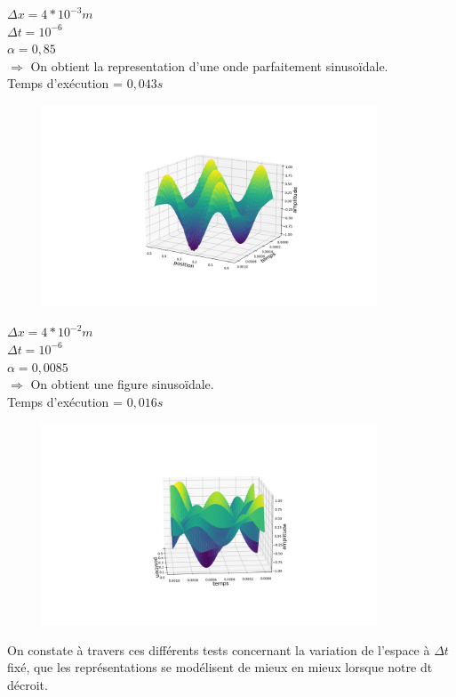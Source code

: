 \begin{enumerate}[label=\alph*)]

\begin{minipage}{.45\textwidth}%

\item $\Delta x=4*{10}^{-3}m$ \\
$\Delta t= {10}^{-6}$ \\
$\alpha= 0,85$\\


$\Longrightarrow$ On obtient la representation d'une onde parfaitement sinusoïdale.\\
Temps d'exécution = $0,043s$

\end{minipage}%
\hfill
\begin{minipage}{.6\textwidth}%
\includegraphics[width=12cm,height=6cm]{dt=10^-6 et dx=0.004.png}

\end{minipage}%
\newline
\begin{minipage}{.45\textwidth}%
\item $\Delta x=4*{10}^{-2}m$ \\
$\Delta t= {10}^{-6}$ \\
$\alpha= 0,0085$\\


$\Longrightarrow$ On obtient une figure sinusoïdale.\\
Temps d'exécution = $0,016s$

\end{minipage}%
\begin{minipage}{.45\textwidth}%
\includegraphics[width=12cm,height=6cm]{dt=10^-6 avec dx=0.04.png}

\end{minipage}%

On constate à travers ces différents tests concernant la variation de l'espace à $\Delta t$ fixé, que les représentations se modélisent de mieux en mieux lorsque notre dt décroit.


\end{enumerate}


